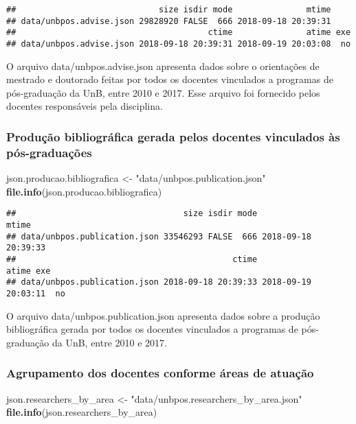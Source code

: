 \documentclass[]{article}
\newenvironment{Shaded}{\begin{snugshade}}{\end{snugshade}}
\newcommand{\KeywordTok}[1]{\textcolor[rgb]{0.13,0.29,0.53}{\textbf{#1}}}
\newcommand{\StringTok}[1]{\textcolor[rgb]{0.31,0.60,0.02}{#1}}
\newcommand{\NormalTok}[1]{#1}
\begin{document}
\begin{verbatim}
##                             size isdir mode               mtime
## data/unbpos.advise.json 29828920 FALSE  666 2018-09-18 20:39:31
##                                       ctime               atime exe
## data/unbpos.advise.json 2018-09-18 20:39:31 2018-09-19 20:03:08  no
\end{verbatim}

O arquivo data/unbpos.advise.json apresenta dados sobre o orientações de
mestrado e doutorado feitas por todos os docentes vinculados a programas
de pós-graduação da UnB, entre 2010 e 2017. Esse arquivo foi fornecido
pelos docentes responsáveis pela disciplina.

\subsubsection{Produção bibliográfica gerada pelos docentes vinculados
às
pós-graduações}\label{producao-bibliografica-gerada-pelos-docentes-vinculados-as-pos-graduacoes}

\begin{Shaded}
\begin{Highlighting}[]
\NormalTok{json.producao.bibliografica <-}\StringTok{ "data/unbpos.publication.json"}
\KeywordTok{file.info}\NormalTok{(json.producao.bibliografica) }
\end{Highlighting}
\end{Shaded}

\begin{verbatim}
##                                  size isdir mode               mtime
## data/unbpos.publication.json 33546293 FALSE  666 2018-09-18 20:39:33
##                                            ctime               atime exe
## data/unbpos.publication.json 2018-09-18 20:39:33 2018-09-19 20:03:11  no
\end{verbatim}

O arquivo data/unbpos.publication.json apresenta dados sobre a produção
bibliográfica gerada por todos os docentes vinculados a programas de
pós-graduação da UnB, entre 2010 e 2017.

\subsubsection{Agrupamento dos docentes conforme áreas de
atuação}\label{agrupamento-dos-docentes-conforme-areas-de-atuacao}

\begin{Shaded}
\begin{Highlighting}[]
\NormalTok{json.researchers_by_area <-}\StringTok{ "data/unbpos.researchers_by_area.json"} 
\KeywordTok{file.info}\NormalTok{(json.researchers_by_area)}
\end{Highlighting}
\end{Shaded}
\end{document}
